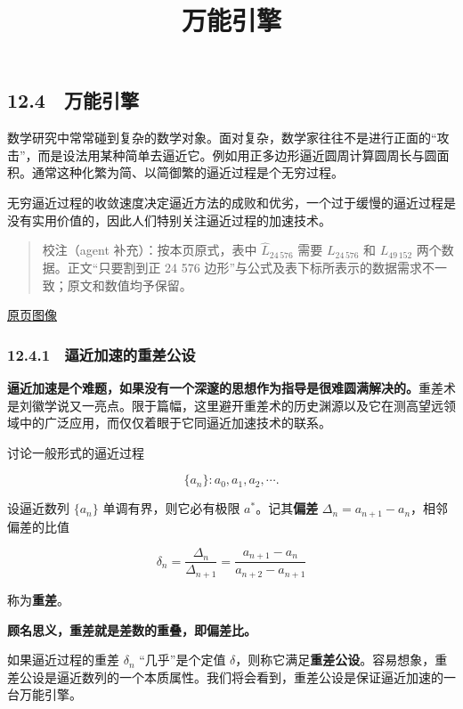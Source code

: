 \documentclass[
  10pt,
  fontset=fandol]{ctexart}
\title{万能引擎}
\author{}
\date{}
\begin{document}
\maketitle

\subsection{12.4　万能引擎}\label{ux4e07ux80fdux5f15ux64ce}

数学研究中常常碰到复杂的数学对象。面对复杂，数学家往往不是进行正面的``攻击''，而是设法用某种简单去逼近它。例如用正多边形逼近圆周计算圆周长与圆面积。通常这种化繁为简、以简御繁的逼近过程是个无穷过程。

无穷逼近过程的收敛速度决定逼近方法的成败和优劣，一个过于缓慢的逼近过程是没有实用价值的，因此人们特别关注逼近过程的加速技术。

\begin{quote}
校注（agent 补充）：按本页原式，表中 \(\widehat L_{24\,576}\) 需要 \(L_{24\,576}\) 和 \(L_{49\,152}\) 两个数据。正文``只要割到正 24 576 边形''与公式及表下标所表示的数据需求不一致；原文和数值均予保留。
\end{quote}

\href{../../source-images/pdf-305.jpeg}{原页图像}

\subsubsection{12.4.1　逼近加速的重差公设}\label{ux903cux8fd1ux52a0ux901fux7684ux91cdux5deeux516cux8bbe}

\textbf{逼近加速是个难题，如果没有一个深邃的思想作为指导是很难圆满解决的。}重差术是刘徽学说又一亮点。限于篇幅，这里避开重差术的历史渊源以及它在测高望远领域中的广泛应用，而仅仅着眼于它同逼近加速技术的联系。

讨论一般形式的逼近过程

\[
\{a_n\}:a_0,a_1,a_2,\cdots.
\]

设逼近数列 \(\{a_n\}\) 单调有界，则它必有极限 \(a^*\)。记其\textbf{偏差} \(\Delta_n=a_{n+1}-a_n\)，相邻偏差的比值

\[
\delta_n=\frac{\Delta_n}{\Delta_{n+1}}=\frac{a_{n+1}-a_n}{a_{n+2}-a_{n+1}}
\]

称为\textbf{重差}。

\textbf{顾名思义，重差就是差数的重叠，即偏差比。}

如果逼近过程的重差 \(\delta_n\) ``几乎''是个定值 \(\delta\)，则称它满足\textbf{重差公设}。容易想象，重差公设是逼近数列的一个本质属性。我们将会看到，重差公设是保证逼近加速的一台万能引擎。
\end{document}
